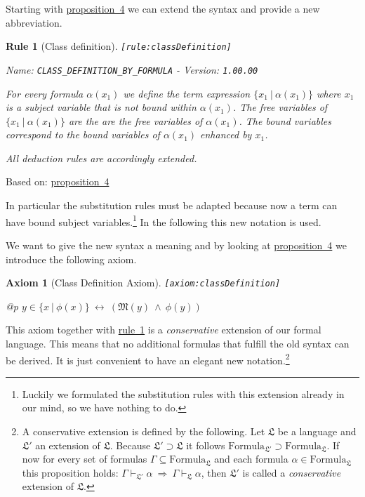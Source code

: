 \documentclass[a4paper,german,10pt,twoside]{book}
\newtheorem{ax}{Axiom}
\newtheorem{rul}{Rule}
\theoremstyle{definition}
\theoremstyle{remark}
\begin{document}
\par
Starting with \hyperlink{theorem:comprehension}{proposition~4} we can extend the syntax and provide a new abbreviation.

\begin{rul}[Class definition]
\label{rule:classDefinition} \hypertarget{rule:classDefinition}{}
{\tt \tiny [\verb]rule:classDefinition]]}

\par
{\em   Name: \verb]CLASS_DEFINITION_BY_FORMULA]  -  Version: \verb]1.00.00]}


For every formula $\alpha(x_1)$ we define the term expression $\{ x_1 \ | \ \alpha(x_1)\}$ where $x_1$ is a subject variable that is not bound within $\alpha(x_1)$. The free variables of $\{ x_1 \ | \ \alpha(x_1)\}$ are the are the free variables of $\alpha(x_1)$. The bound variables correspond to the bound variables of $\alpha(x_1)$ enhanced by $x_1$. 
\par
All deduction rules are accordingly extended.
\end{rul}
Based on: 
 \hyperlink{theorem:comprehension}{proposition~4}

In particular the substitution rules must be adapted because now a term can have bound subject variables.\footnote{Luckily we formulated the substitution rules with this extension already in our mind, so we have nothing to do.}
In the following this new notation is used.


\par
We want to give the new syntax a meaning and by looking at \hyperlink{theorem:comprehension}{proposition~4} we introduce the following axiom.

\begin{ax}[Class Definition Axiom]
\label{axiom:classDefinition} \hypertarget{axiom:classDefinition}{}
{\tt \tiny [\verb]axiom:classDefinition]]}
\mbox{}
\begin{longtable}{{@{\extracolsep{\fill}}p{\linewidth}}}
\centering $y \in \{ x \ | \ \phi(x) \} \ \leftrightarrow\ (\mathfrak{M}(y)\ \land\ \phi(y))$
\end{longtable}

\end{ax}

This axiom together with \hyperlink{rule:classDefinition}{rule~1} is a \emph{conservative} extension of our formal language. This means that no additional formulas that fulfill the old syntax can be derived. It is just convenient to have an elegant new notation.\footnote{
A conservative extension is defined by the following.
Let $\mathfrak{L}$ be a language and $\mathfrak{L'}$ an extension of $\mathfrak{L}$. Because $\mathfrak{L'} \supset \mathfrak{L}$ it follows $\mbox{Formula}_\mathfrak{L'} \supset \mbox{Formula}_\mathfrak{L}$. If now for every set of formulas $\Gamma \subseteq \mbox{Formula}_\mathfrak{L}$ and each formula $\alpha \in \mbox{Formula}_\mathfrak{L}$ this proposition holds: $\Gamma \vdash_\mathfrak{L'} \alpha \ \Rightarrow \ \Gamma \vdash_\mathfrak{L} \alpha$, then $\mathfrak{L'}$ is called a \emph{conservative} extension of $\mathfrak{L}$.}
\end{document}
